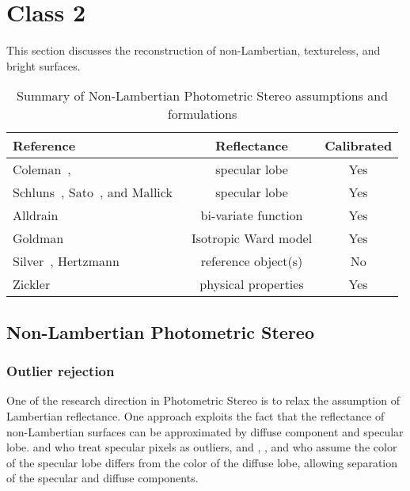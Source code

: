 \section{Class 2}
This section discusses the reconstruction of non-Lambertian, textureless, and bright surfaces. 

\begin{table}[h]
  \centering
  \begin{tabular}{l*{2}{c}}
  \hline
  \textbf{Reference} & Reflectance & Calibrated \\
  \hline
  Coleman~\cite{coleman1982obtaining}, \citeauthor{barsky20034} & specular lobe & Yes\\
  Schluns~\cite{schluns1993photometric}, Sato~\cite{sato1994temporal}, and Mallick~\cite{mallick2005beyond} & specular lobe & Yes\\
  Alldrain~\cite{alldrin2008photometric} & bi-variate function & Yes\\
  Goldman~\cite{goldman2010shape} & Isotropic Ward model & Yes\\
  Silver~\cite{silver1980determining}, Hertzmann~\cite{hertzmann2005example} & reference object(s) & No\\
  Zickler~\cite{zickler2002helmholtz} & physical properties & Yes\\
  \hline
  \end{tabular}
  \caption{Summary of Non-Lambertian Photometric Stereo assumptions and formulations}
  \label{tab:class_2}
\end{table}

\subsection{Non-Lambertian Photometric Stereo}
\subsubsection{Outlier rejection}
One of the research direction in Photometric Stereo is to relax the assumption of Lambertian reflectance. One approach exploits the fact that the reflectance of non-Lambertian surfaces can be approximated by diffuse component and specular lobe. \citeauthor{coleman1982obtaining} and \citeauthor{barsky20034} who treat specular pixels as outliers, and \citeauthor{schluns1993photometric}, \citeauthor{sato1994temporal}, and \citeauthor{mallick2005beyond} who assume the color of the specular lobe differs from the color of the diffuse lobe, allowing separation of the specular and diffuse components.

